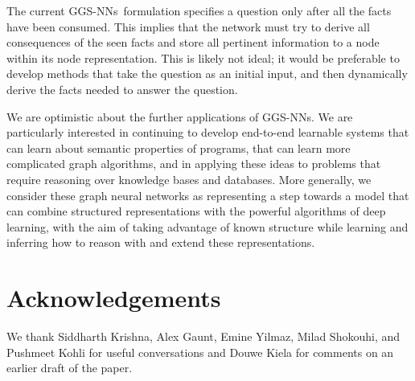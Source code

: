 \documentclass{article} %
\newcommand{\OurMethodShort}{GGS-NN}
\newcommand{\OurMethodShorts}{\OurMethodShort s}
\begin{document}

The current \OurMethodShorts~formulation specifies a question only after
all the facts have been consumed. This implies that the network must try
to derive all consequences of the seen facts and store all pertinent information
to a node within its node representation. This is likely not ideal;
it would be preferable to develop methods that take the question as an initial
input, and then dynamically derive the facts needed to answer the question.

We are optimistic about the further applications of \OurMethodShorts.
We are particularly interested in continuing to develop end-to-end learnable
systems that can learn about semantic properties of programs, that can
learn more complicated graph algorithms,  and in
applying these ideas to problems that
require reasoning over knowledge bases and databases.
More generally, we consider these graph neural networks as representing a
step towards a model that can combine structured representations with the
powerful algorithms of deep learning, with the aim of taking advantage of known
structure while learning and inferring how to reason with and extend 
these representations.

\section*{Acknowledgements}
We thank Siddharth Krishna, Alex Gaunt,
Emine Yilmaz, Milad Shokouhi,
and Pushmeet Kohli for useful
conversations and Douwe Kiela for comments on an earlier draft of the
paper.





\end{document}
